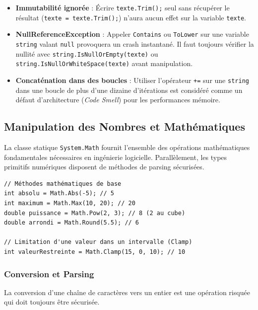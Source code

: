 \begin{tcolorbox}[colback=backcolour,colframe=keywordcolor,title=\textbf{Pièges Courants \& Erreurs}]
\begin{itemize}
    \item \textbf{Immutabilité ignorée} : Écrire \texttt{texte.Trim();} seul sans récupérer le résultat (\texttt{texte = texte.Trim();}) n'aura aucun effet sur la variable \texttt{texte}.
    \item \textbf{NullReferenceException} : Appeler \texttt{Contains} ou \texttt{ToLower} sur une variable \texttt{string} valant \texttt{null} provoquera un crash instantané. Il faut toujours vérifier la nullité avec \texttt{string.IsNullOrEmpty(texte)} ou \texttt{string.IsNullOrWhiteSpace(texte)} avant manipulation.
    \item \textbf{Concaténation dans des boucles} : Utiliser l'opérateur \texttt{+=} sur une \texttt{string} dans une boucle de plus d'une dizaine d'itérations est considéré comme un défaut d'architecture (\textit{Code Smell}) pour les performances mémoire.
\end{itemize}
\end{tcolorbox}

\subsection{Manipulation des Nombres et Mathématiques}

La classe statique \texttt{System.Math} fournit l'ensemble des opérations mathématiques fondamentales nécessaires en ingénierie logicielle. Parallèlement, les types primitifs numériques disposent de méthodes de parsing sécurisées.

\begin{lstlisting}[style=csharpstyle]
// Méthodes mathématiques de base
int absolu = Math.Abs(-5); // 5
int maximum = Math.Max(10, 20); // 20
double puissance = Math.Pow(2, 3); // 8 (2 au cube)
double arrondi = Math.Round(5.5); // 6

// Limitation d'une valeur dans un intervalle (Clamp)
int valeurRestreinte = Math.Clamp(15, 0, 10); // 10
\end{lstlisting}

\subsubsection{Conversion et Parsing}
La conversion d'une chaîne de caractères vers un entier est une opération risquée qui doit toujours être sécurisée.

